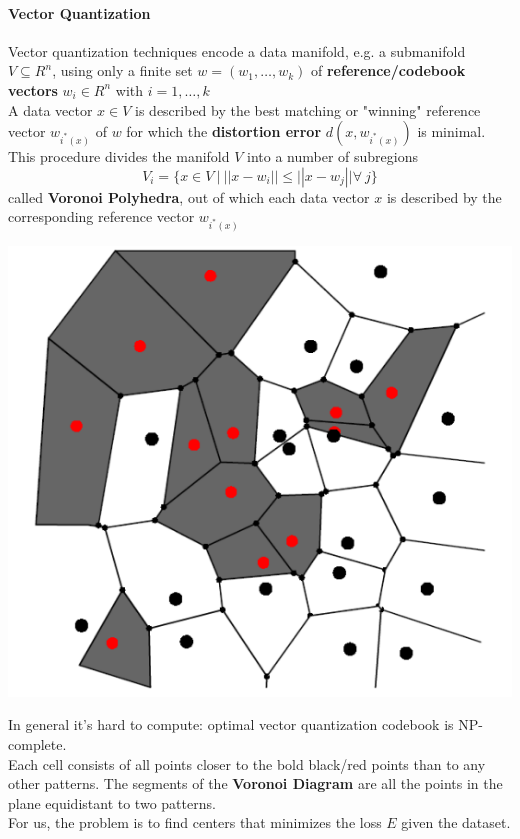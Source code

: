 \documentclass[10pt]{report}
\begin{document}
\paragraph{Vector Quantization} Vector quantization techniques encode a data manifold, e.g. a submanifold $V\subseteq R^n$, using only a finite set $w=(w_1,\ldots,w_k)$ of \textbf{reference/codebook vectors} $w_i\in R^n$ with $i=1,\ldots,k$\\
A data vector $x\in V$ is described by the best matching or "winning" reference vector $w_{i^*(x)}$ of $w$ for which the \textbf{distortion error} $d(x, w_{i^*(x)})$ is minimal.\\
This procedure divides the manifold $V$ into a number of subregions $$V_i=\{x\in V\:|\:||x-w_i||\leq ||x-w_j||\forall\:j\}$$ called \textbf{Voronoi Polyhedra}, out of which each data vector $x$ is described by the corresponding reference vector $w_{i^*(x)}$
\begin{center}
	\includegraphics[scale=0.5]{32.png}
\end{center}
In general it's hard to compute: optimal vector quantization codebook is NP-complete.\\
Each cell consists of all points closer to the bold black/red points than to any other patterns. The segments of the \textbf{Voronoi Diagram} are all the points in the plane equidistant to two patterns.\\
For us, the problem is to find centers that minimizes the loss $E$ given the dataset.\\\\
\end{document}
